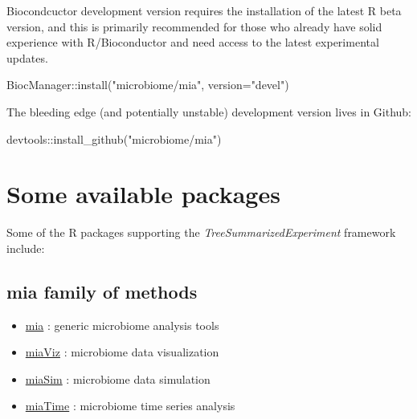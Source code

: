 \documentclass[
]{book}
\newenvironment{Shaded}{\begin{snugshade}}{\end{snugshade}}
\newcommand{\AttributeTok}[1]{\textcolor[rgb]{0.77,0.63,0.00}{#1}}
\newcommand{\FunctionTok}[1]{\textcolor[rgb]{0.00,0.00,0.00}{#1}}
\newcommand{\NormalTok}[1]{#1}
\newcommand{\SpecialCharTok}[1]{\textcolor[rgb]{0.00,0.00,0.00}{#1}}
\newcommand{\StringTok}[1]{\textcolor[rgb]{0.31,0.60,0.02}{#1}}
\providecommand{\tightlist}{%
  \setlength{\itemsep}{0pt}\setlength{\parskip}{0pt}}
\begin{document}
Biocondcuctor development version requires the installation of the
latest R beta version, and this is primarily recommended for those who
already have solid experience with R/Bioconductor and need access to
the latest experimental updates.

\begin{Shaded}
\begin{Highlighting}[]
\NormalTok{BiocManager}\SpecialCharTok{::}\FunctionTok{install}\NormalTok{(}\StringTok{"microbiome/mia"}\NormalTok{, }\AttributeTok{version=}\StringTok{"devel"}\NormalTok{)}
\end{Highlighting}
\end{Shaded}

The bleeding edge (and potentially unstable) development version lives
in Github:

\begin{Shaded}
\begin{Highlighting}[]
\NormalTok{devtools}\SpecialCharTok{::}\FunctionTok{install\_github}\NormalTok{(}\StringTok{"microbiome/mia"}\NormalTok{)}
\end{Highlighting}
\end{Shaded}

\hypertarget{some-available-packages}{%
\section{Some available packages}\label{some-available-packages}}

Some of the R packages supporting the \emph{TreeSummarizedExperiment} framework include:

\hypertarget{mia-family-of-methods}{%
\subsection{mia family of methods}\label{mia-family-of-methods}}

\begin{itemize}
\tightlist
\item
  \href{microbiome.github.io/mia}{mia} : generic microbiome analysis tools\\
\item
  \href{microbiome.github.io/miaViz}{miaViz} : microbiome data visualization
\item
  \href{microbiome.github.io/miaSim}{miaSim} : microbiome data simulation
\item
  \href{microbiome.github.io/miaTime}{miaTime} : microbiome time series analysis
\end{itemize}
\end{document}
